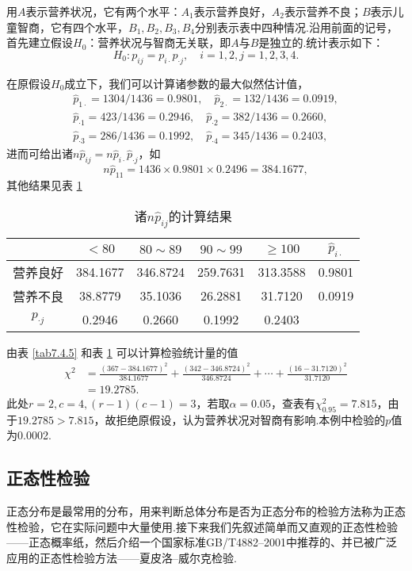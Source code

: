 \begin{solution}
  用$A$表示营养状况，它有两个水平：$A_1$表示营养良好，$A_2$表示营养不良；$B$表示儿童智商，它有四个水平，$B_1,B_2,B_3,B_4$分别表示表中四种情况.沿用前面的记号，首先建立假设$H_0$：营养状况与智商无关联，即$A$与$B$是独立的.统计表示如下：
  \[
    H_0:p_{ij}=p_{i\cdot}p_{\cdot j},\quad i=1,2,j=1,2,3,4.
  \]

  在原假设$H_0$成立下，我们可以计算诸参数的最大似然估计值，
  \begin{gather*}
    \hat p_{1\cdot} = 1304/1436 = 0.9801,\quad \hat p_{2\cdot} = 132/1436 = 0.0919, \\
    \hat p_{\cdot1} = 423/1436 = 0.2946,\quad \hat p_{\cdot2} = 382/1436 = 0.2660, \\
    \hat p_{\cdot 3} = 286/1436 = 0.1992,\quad \hat p_{\cdot 4} = 345/1436 = 0.2403,
  \end{gather*}
  进而可给出诸$n\hat p_{ij}=n\hat p_{i\cdot}\hat p_{\cdot j}$，如
  \[
    n\hat p_{11} = 1436\times 0.9801 \times 0.2496 = 384.1677,
  \]
  其他结果见表 \ref{tab7.4.6}
  \begin{table}[!ht]
    \centering
    \caption{诸$n\hat p_{ij}$的计算结果}\label{tab7.4.6}
    \begin{tabular}{c|cccc|c}
      \toprule
        & $<80$ & $80\sim89$ & $90\sim99$ & $\ge100$ & $\hat p_{i\cdot}$ \\
        \midrule
      营养良好 & 384.1677 & 346.8724 & 259.7631 & 313.3588 & 0.9801 \\
      营养不良 & 38.8779 & 35.1036 & 26.2881 & 31.7120 & 0.0919 \\
      \midrule
      $p_{\cdot j}$ & 0.2946 & 0.2660 & 0.1992 & 0.2403 & \\
      \bottomrule
    \end{tabular}
  \end{table}
  由表 \ref{tab7.4.5} 和表 \ref{tab7.4.6} 可以计算检验统计量的值
    \begin{align*}
      \chi^2 & = \frac{(367-384.1677)^2}{384.1677} + \frac{(342-346.8724)^2}{346.8724} + \cdots + \frac{(16-31.7120)^2}{31.7120} \\
      & = 19.2785.
    \end{align*}
    此处$r=2,c=4,(r-1)(c-1)=3$，若取$\alpha=0.05$，查表有$\chi^2_{0.95}=7.815$，由于$19.2785>7.815$，故拒绝原假设，认为营养状况对智商有影响.本例中检验的$p$值为0.0002.
\end{solution}


\subsection{正态性检验\label{ssec:7.4.3}}
正态分布是最常用的分布，用来判断总体分布是否为正态分布的检验方法称为正态性检验，它在实际问题中大量使用.接下来我们先叙述简单而又直观的正态性检验——正态概率纸，然后介绍一个国家标准GB/T4882--2001中推荐的、并已被广泛应用的正态性检验方法——夏皮洛--威尔克检验.

